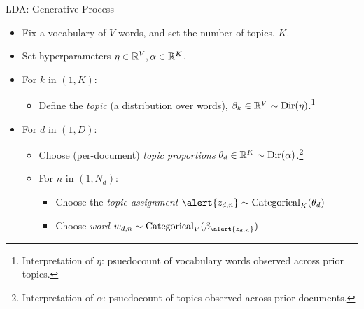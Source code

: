 \documentclass[10pt]{beamer}
\begin{document}
\begin{frame}{LDA: Generative Process}
\footnotesize

\begin{itemize}
\item Fix a vocabulary of $V$ words, and set the number of topics,  $K$. 
\item Set hyperparameters $\eta \in \mathbb{R}^V, \alpha \in \mathbb{R}^K$.
\item For $k$ in $(1,K)$:
	\begin{itemize}
	\item Define the \textit{topic} \tiny (a distribution over words),  \footnotesize $\beta_k \in \mathbb{R}^V \sim \text{Dir}(\eta)$.\footnote{\tiny Interpretation of $\eta$: psuedocount of vocabulary words observed across prior topics.}
	\end{itemize}
\item For $d$ in $(1,D):$
	\begin{itemize}
	\item Choose  \tiny (per-document)  \footnotesize \textit{topic proportions}   $\theta_d \in \mathbb{R}^K \sim \text{Dir}(\alpha)$.\footnote{\tiny Interpretation of $\alpha$: psuedocount of topics observed across prior documents.}
	\item For $n$ in $(1, N_d)$:
		\begin{itemize}
		\item Choose the \textit{topic assignment} $\alert{z_{d,n}} \sim \text{Categorical}_K (\theta_d)$
		\item Choose \textit{word} $w_{d,n} \sim \text{Categorical}_V(\beta_{\alert{z_{d,n}}})$
		\end{itemize}
	\end{itemize}
\end{itemize}
\end{frame}
\end{document}
